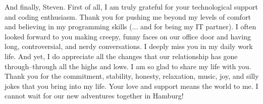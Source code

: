 \documentclass[
]{scrbook}
\begin{document}
\begin{small}
And finally, Steven. First of all, I am truly grateful for your technological support and coding enthusiasm. Thank you for pushing me beyond my levels of comfort and believing in my programming skills (... and for being my IT partner). I often looked forward to you making creepy, funny faces on our office door and having long, controversial, and nerdy conversations. I deeply miss you in my daily work life. And yet, I do appreciate all the changes that our relationship has gone through\thinspace --\thinspace through all the highs and lows. I am so glad to share my life with you. Thank you for the commitment, stability, honesty, relaxation, music, joy, and silly jokes that you bring into my life. Your love and support means the world to me. I cannot wait for our new adventures together in Hamburg!

\end{small}
\end{document}
